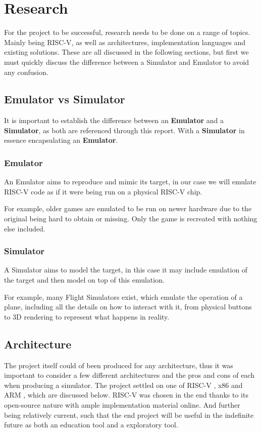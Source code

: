 \chapter{Research}
\label{ch:research}

For the project to be successful, research needs to be done on a range of topics. Mainly being RISC-V, as well as architectures, implementation languages and existing solutions. These are all discussed in the following sections, but first we must quickly discuss the difference between a Simulator and Emulator to avoid any confusion.

\section{Emulator vs Simulator}\label{sec:sim_vs_em}
It is important to establish the difference between an \textbf{Emulator} and a \textbf{Simulator}, as both are referenced through this report. With a \textbf{Simulator} in essence encapsulating an \textbf{Emulator}.

\subsection{Emulator}
An Emulator aims to reproduce and mimic its target, in our case we will emulate RISC-V code as if it were being run on a physical RISC-V chip.

For example, older games are emulated to be run on newer hardware due to the original being hard to obtain or missing. Only the game is recreated with nothing else included.
\subsection{Simulator}
A Simulator aims to model the target, in this case it may include emulation of the target and then model on top of this emulation.

For example, many Flight Simulators exist, which emulate the operation of a plane, including all the details on how to interact with it, from physical buttons to 3D rendering to represent what happens in reality.

\section{Architecture}
The project itself could of been produced for any architecture, thus it was important to consider a few different architectures and the pros and cons of each when producing a simulator. The project settled on one of RISC-V \cite{waterman_2019_the} , x86 \cite{intelcorporation_2023_intel} and ARM \cite{armltd_2023_defining}, which are discussed below. RISC-V was chosen in the end thanks to its open-source nature with ample implementation material online. And further being relatively current, such that the end project will be useful in the indefinite future as both an education tool and a exploratory tool.

